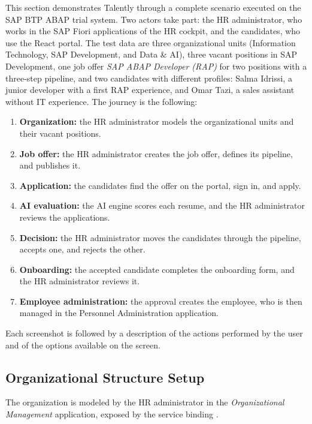 This section demonstrates Talently through a complete scenario executed on the SAP BTP ABAP trial system. Two actors take part: the HR administrator, who works in the SAP Fiori applications of the HR cockpit, and the candidates, who use the React portal. The test data are three organizational units (Information Technology, SAP Development, and Data \& AI), three vacant positions in SAP Development, one job offer \emph{SAP ABAP Developer (RAP)} for two positions with a three-step pipeline, and two candidates with different profiles: Salma Idrissi, a junior developer with a first RAP experience, and Omar Tazi, a sales assistant without IT experience. The journey is the following:

\begin{enumerate}\setlength{\itemsep}{0pt}\setlength{\parsep}{0pt}
    \item \textbf{Organization:} the HR administrator models the organizational units and their vacant positions.
    \item \textbf{Job offer:} the HR administrator creates the job offer, defines its pipeline, and publishes it.
    \item \textbf{Application:} the candidates find the offer on the portal, sign in, and apply.
    \item \textbf{AI evaluation:} the AI engine scores each resume, and the HR administrator reviews the applications.
    \item \textbf{Decision:} the HR administrator moves the candidates through the pipeline, accepts one, and rejects the other.
    \item \textbf{Onboarding:} the accepted candidate completes the onboarding form, and the HR administrator reviews it.
    \item \textbf{Employee administration:} the approval creates the employee, who is then managed in the Personnel Administration application.
\end{enumerate}

Each screenshot is followed by a description of the actions performed by the user and of the options available on the screen.

\subsection{Organizational Structure Setup}
\label{subsec:wt_org}

The organization is modeled by the HR administrator in the \emph{Organizational Management} application, exposed by the service binding .

